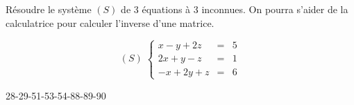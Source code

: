 \documentclass[a4paper]{article}
\begin{document}
\begin{exercice}{}{}
	Résoudre le système $(S)$ de 3 équations à 3 inconnues. On pourra s'aider de la calculatrice pour calculer l'inverse d'une matrice.

$$(S) \; \left \{
\begin{array}{rcl}
x-y+2z &=& 5 \\
2x+y-z &=& 1 \\
-x+2y+z & = &6 
\end{array}
\right.$$
\end{exercice}

\begin{exercices}{}{}
	28-29-51-53-54-88-89-90
\end{exercices}
\end{document}
